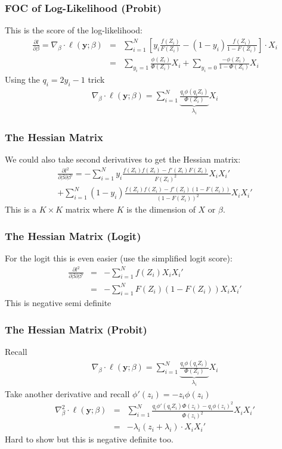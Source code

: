 \documentclass[aspectratio=169]{beamer}
\begin{document}
\begin{frame}
\frametitle{FOC of Log-Likelihood (Probit)}
This is the \alert{score} of the log-likelihood:
\begin{eqnarray*}
\frac{\partial l }{\partial \beta} = \nabla_{\beta} \cdot \ell(\mathbf{y}; \beta) &=&  \sum_{i=1}^N  \left[ y_i \frac{ f(Z_i) }{ F(Z_i)}  -  (1-y_i) \frac{f(Z_i) }{1-F(Z_i)} \right] \cdot X_i  \\
 &=&  \sum_{y_i=1}  \frac{\phi(Z_i) }{ \Phi(Z_i)} X_i +\sum_{y_i=0} \frac{-\phi(Z_i) }{1-\Phi(Z_i)} X_i
\end{eqnarray*}
Using the $q_i = 2 y_i -1$ trick
\begin{eqnarray*}
\nabla_{\beta} \cdot \ell(\mathbf{y}; \beta)= \sum_{i=1}^N \underbrace{\frac{ q_i \phi(q_i Z_i)}{\Phi(Z_i)}}_{\lambda_i} X_i
\end{eqnarray*}
\end{frame}


\begin{frame}
\frametitle{The Hessian Matrix}
We could also take second derivatives to get the \alert{Hessian} matrix:
\begin{eqnarray*}
\frac{\partial l^2 }{\partial \beta \partial \beta'} = - \sum_{i=1}^N   y_i \frac{ f(Z_i)  f(Z_i) - f'(Z_i) F(Z_i) }{ F(Z_i)^2}  X_i X_i' \\
+  \sum_{i=1}^N   (1-y_i) \frac{f(Z_i)f(Z_i) - f'(Z_i)(1-F(Z_i))}{(1-F(Z_i))^2}  X_i X_i'
\end{eqnarray*}
This is a $K\times K$ matrix where $K$ is the dimension of $X$ or $\beta$.
\end{frame}



\begin{frame}
\frametitle{The Hessian Matrix (Logit)}
For the logit this is even easier (use the simplified logit score):
\begin{eqnarray*}
\frac{\partial l^2 }{\partial \beta \partial \beta'}  &=& - \sum_{i=1}^N f(Z_i) X_i X_i' \\
&=& - \sum_{i=1}^N F(Z_i) (1- F(Z_i)) X_i X_i'
\end{eqnarray*}
This is \alert{negative semi definite}
\end{frame}

\begin{frame}
\frametitle{The Hessian Matrix (Probit)}
Recall
\begin{eqnarray*}
\nabla_{\beta} \cdot \ell(\mathbf{y}; \beta)= \sum_{i=1}^N \underbrace{\frac{ q_i \phi(q_i Z_i)}{\Phi(Z_i)}}_{\lambda_i} X_i
\end{eqnarray*}
Take another derivative and recall $\phi'(z_i) = - z_i \phi(z_i)$
\begin{eqnarray*}
\nabla_{\beta}^2 \cdot \ell(\mathbf{y}; \beta)&=& \sum_{i=1}^N \frac{q_i \phi'(q_i Z_i) \Phi(z_i) - q_i \phi(z_i)^2}{\Phi(z_i)^2}  X_i X_i' \\
&=& - \lambda_i( z_i + \lambda_i) \cdot X_i X_i'
\end{eqnarray*}
Hard to show but this is \alert{negative definite} too.
\end{frame}
\end{document}
